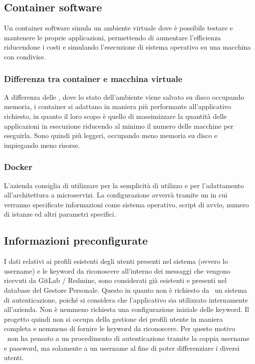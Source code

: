 	\subsection{Container software}
	
	Un container software simula un ambiente virtuale dove è possibile testare e mantenere le proprie applicazioni, permettendo di aumentare l'efficienza riducendone i costi e simulando l'esecuzione di sistema operativo su una macchina con  condivise.
		
		\subsubsection{Differenza tra container e macchina virtuale}
		A differenza delle , dove lo stato dell'ambiente viene salvato su disco occupando memoria, i container si adattano in maniera più performante all'applicativo richiesto, in quanto il loro scopo è quello di massimizzare la quantità delle applicazioni in esecuzione riducendo al minimo il numero delle macchine per eseguirla.
		Sono quindi più leggeri, occupando meno memoria su disco e impiegando meno risorse.
		
		\subsubsection{Docker}
		L'azienda consiglia di utilizzare  per la semplicità di utilizzo e per l'adattamento all'architettura a microservizi.
		La configurazione avverrà tramite un  in cui verranno specificate informazioni come sistema operativo, script di avvio, numero di istanze ed altri parametri specifici.

	\subsection{Informazioni preconfigurate}
	I dati relativi ai profili esistenti degli utenti presenti nel sistema (ovvero lo username) e le keyword da riconoscere all'interno dei messaggi che vengono ricevuti da GitLab / Redmine, sono considerati già esistenti e presenti nel database del Gestore Personale.
	Questo in quanto non è richiesto da \II\ un sistema di autenticazione, poiché si considera che l'applicativo sia utilizzato internamente all'azienda.
	Non è nemmeno richiesta una configurazione iniziale delle keyword.
	Il progetto quindi non si occupa della gestione dei profili utente in maniera completa e nemmeno di fornire le keyword da riconoscere.
	Per questo motivo \gruppo\ non ha pensato a un procedimento di autenticazione tramite la coppia username e password, ma solamente a un username al fine di poter differenziare i diversi utenti.